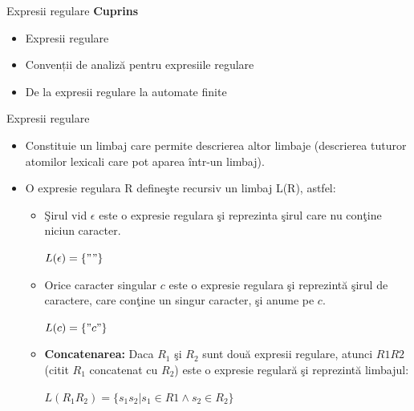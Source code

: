 \documentclass[pdf]{beamer}
\begin{document}



\begin{frame}{Expresii regulare}
\textbf{Cuprins}
\begin{itemize}
\item
Expresii regulare
\item
Convenții de analiză pentru expresiile regulare
\item
De la expresii regulare la automate finite
\end{itemize}
\end{frame}



\begin{frame}{Expresii regulare}
\begin{itemize}
\item
Constituie un limbaj care permite descrierea altor limbaje (descrierea tuturor atomilor lexicali care pot aparea într-un limbaj).
\item
O expresie regulara R defineşte recursiv un limbaj L(R), astfel:
\begin{itemize}
\item
Şirul vid $\epsilon$ este o expresie regulara şi reprezinta şirul care nu conţine niciun caracter. 

\begin{center}
$L(\epsilon)=\{""\}$
\end{center}
\item 
Orice caracter singular $c$ este o expresie regulara şi reprezintă şirul de caractere, care conţine un singur caracter, şi anume pe $c$. 

\begin{center}
$L(c)=\{"c"\}$
\end{center}
\item 
\textbf{Concatenarea:} Daca $R_1$ şi $R_2$ sunt două expresii regulare, atunci $R1R2$ (citit $R_1$ concatenat cu $R_2$) este o expresie regulară şi reprezintă limbajul: 

\begin{center}
$L(R_1R_2)=\{s_1s_2| s_1 \in R1 \wedge s_2 \in R_2\}$
\end{center}
\end{itemize}
\end{itemize}
\end{frame}
\end{document}
